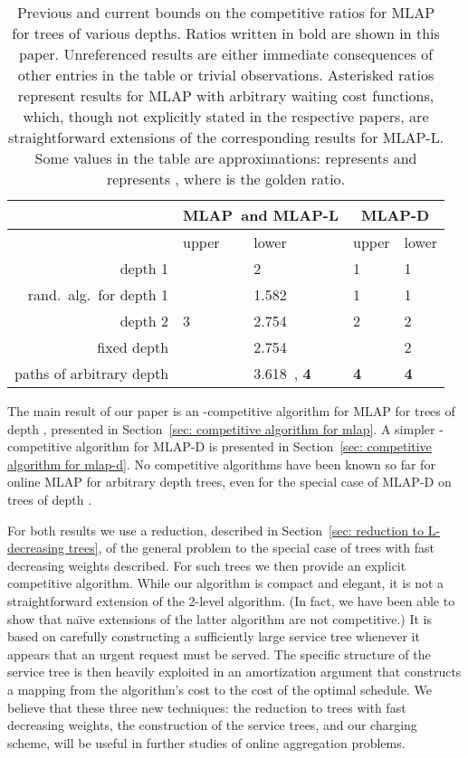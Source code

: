 \documentclass[a4paper]{article}
\newcommand{\MLAP}{\mbox{\rm\textsf{MLAP}}}
\newcommand{\MLAPL}{\mbox\rm{\textsf{MLAP-L}}}
\newcommand{\MLAPD}{\mbox{\rm\textsf{MLAP-D}}}
\begin{document}
\begin{table}
\begin{center}
\begin{tabular}{r|l|l|l|l|}
	& \multicolumn{2}{c|}{\MLAP\ and \MLAPL} & \multicolumn{2}{c|}{\MLAPD} \\
\hline
 & upper & lower & upper & lower \\
\hline
depth 1 & ~\cite{tcp-ack-det-journal} & 2~\cite{tcp-ack-det-journal}
& 1 & 1 \\
rand.~alg.~for depth 1 & ~\cite{tcp-ack} &
1.582~\cite{tcp-ack-lower-bound} &
1 & 1 \\
depth 2 & 3~\cite{jrp-online-buchbinder} & 2.754~\cite{jrp-soda-2014} & 2~\cite{jrp-soda-2014} & 2~\cite{jrp-soda-2014} \\
fixed depth  &  & 2.754 &  & 2 \\
paths of arbitrary depth & ~\cite{aggregation_wads_2013} & 3.618~\cite{aggregation_wads_2013}, {\bf 4} & {\bf 4} & {\bf 4} \\
\hline
\end{tabular}
\end{center}
\caption{Previous and current bounds on the competitive ratios for {\MLAP} for trees of various depths.
Ratios written in bold are shown in this paper. Unreferenced results are either immediate consequences of
other entries in the table or trivial observations.
Asterisked ratios represent results for {\MLAP} with arbitrary waiting cost functions, which, though
not explicitly stated in the respective papers,  are straightforward extensions of the
corresponding results for {\MLAPL}. Some values in the table are approximations:
 represents  and  represents , where  is the golden ratio.
}
\label{tab:results}
\end{table}

The main result of our paper is an -competitive algorithm
for {\MLAP} for trees of depth , presented in 
Section~\ref{sec: competitive algorithm for mlap}.  A simpler -competitive
algorithm for {\MLAPD} is presented in Section~\ref{sec: competitive algorithm for mlap-d}. 
No competitive algorithms have been known so far
for online {\MLAP} for arbitrary depth trees, even for the special case of
{\MLAPD} on trees of depth .


For both results we use a reduction, described in Section~\ref{sec: reduction to L-decreasing trees},
of the general problem to the special case of trees with fast decreasing weights described. 
For such trees we then provide an explicit competitive algorithm. 
While our algorithm is compact and elegant, it is not a straightforward
extension of the 2-level algorithm.  (In fact, we have been able to show that na\"{\i}ve 
extensions of the latter algorithm are not competitive.)
It is based on carefully constructing a sufficiently large service tree
whenever it appears that an urgent request must be served. The specific structure of the service 
tree is then heavily exploited in an amortization argument that constructs a
mapping from the algorithm's cost to the cost of the optimal schedule.
We believe that these three new techniques: the reduction to trees with fast decreasing weights,
the construction of the service trees, and our charging scheme, 
will be useful in further studies of online aggregation problems.
\end{document}
